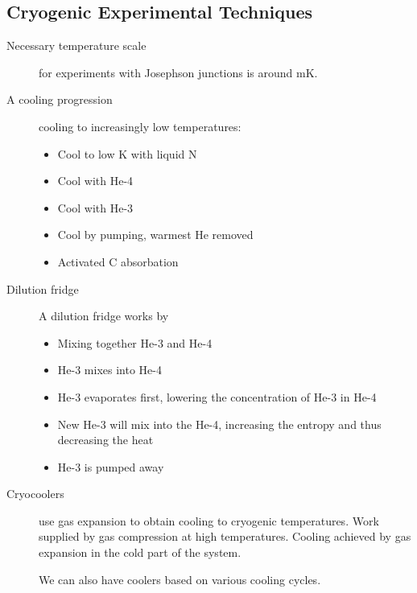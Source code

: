 \subsection{Cryogenic Experimental Techniques}
\begin{description}
\item[Necessary temperature scale] for experiments with Josephson junctions is around mK. 

\item[A cooling progression] cooling to increasingly low temperatures:
\begin{itemize}
\item Cool to low K with liquid N
\item Cool with He-4
\item Cool with He-3
\item Cool by pumping, warmest He removed
\item Activated C absorbation
\end{itemize}

\item[Dilution fridge] A dilution fridge works by 
\begin{itemize}
\item Mixing together He-3 and He-4
\item He-3 mixes into He-4
\item He-3 evaporates first, lowering the concentration of He-3 in He-4
\item New He-3 will mix into the He-4, increasing the entropy and thus decreasing the heat
\item He-3 is pumped away 
\end{itemize}

\item[Cryocoolers] use gas expansion to obtain cooling to cryogenic temperatures. Work supplied by gas compression at high temperatures. Cooling achieved by gas expansion in the cold part of the system. 

We can also have coolers based on various cooling cycles. 



\end{description}

